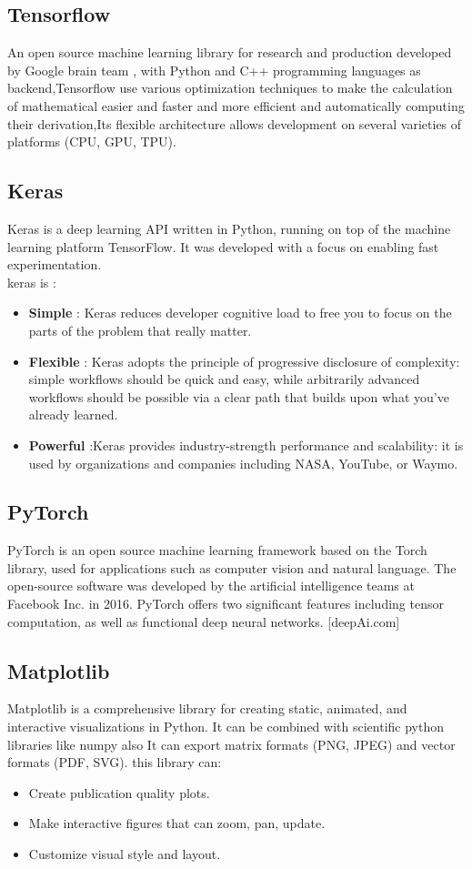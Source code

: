 \subsection{Tensorflow}
An open source machine learning library for research and production developed by
Google brain team , with Python and C++ programming languages as backend,Tensorflow use various optimization techniques to make the calculation of mathematical
easier and faster and more efficient and automatically computing their derivation,Its flexible architecture allows development on several varieties of platforms (CPU, GPU, TPU). \cite{w3}
\subsection{Keras}
Keras is a deep learning API written in Python, running on top of the machine learning platform TensorFlow. It was developed with a focus on enabling fast experimentation.\cite{w4} \\
keras is :
\begin{itemize}
    \item \textbf{Simple} : Keras reduces developer cognitive load to free you to focus on the parts of the problem that really matter.
    \item \textbf{Flexible }: Keras adopts the principle of progressive disclosure of complexity: simple workflows should be quick and easy, while arbitrarily advanced workflows should be possible via a clear path that builds upon what you've already learned.
    \item \textbf{Powerful }:Keras provides industry-strength performance and scalability: it is used by organizations and companies including NASA, YouTube, or Waymo. \cite{w4}

\end{itemize}
\subsection{PyTorch}
PyTorch is an open source machine learning framework based on the Torch library, used for applications such as computer vision and natural language.
The open-source software was developed by the artificial intelligence teams at Facebook Inc. in 2016. PyTorch offers two significant features including tensor computation, as well as functional deep neural networks. [deepAi.com]

\subsection{Matplotlib}
Matplotlib is a comprehensive library for creating static, animated, and interactive visualizations in Python. 
It can be combined with scientific python libraries like numpy also
It can export matrix formats (PNG, JPEG) and vector formats (PDF,
SVG). \cite{w5} 
this library can:
\begin{itemize}
    \item Create publication quality plots.
    \item Make interactive figures that can zoom, pan, update.
    \item Customize visual style and layout. \cite{w5}
\end{itemize}

